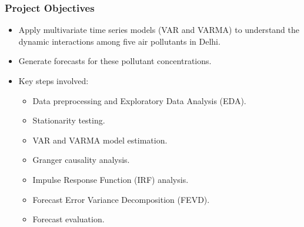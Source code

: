\documentclass[svgnames, 12pt]{beamer}
\begin{document}
\begin{frame}
    \frametitle{Project Objectives}
    \begin{itemize}
        \item Apply multivariate time series models (VAR and VARMA) to understand the dynamic interactions among five air pollutants in Delhi.
        \item Generate forecasts for these pollutant concentrations.
        \item Key steps involved:
        \begin{itemize}
            \item Data preprocessing and Exploratory Data Analysis (EDA).
            \item Stationarity testing.
            \item VAR and VARMA model estimation.
            \item Granger causality analysis.
            \item Impulse Response Function (IRF) analysis.
            \item Forecast Error Variance Decomposition (FEVD).
            \item Forecast evaluation.
        \end{itemize}
    \end{itemize}
\end{frame}

\end{document}
